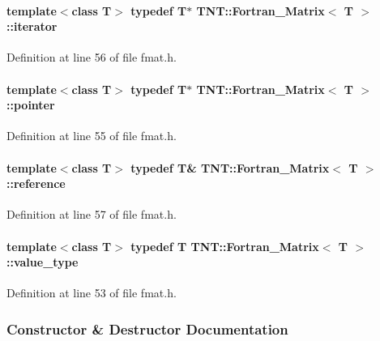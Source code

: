 \paragraph[{iterator}]{\setlength{\rightskip}{0pt plus 5cm}template$<$class T$>$ typedef T$\ast$ {\bf TNT::Fortran\_\-Matrix}$<$ T $>$::{\bf iterator}}\hfill\label{class_t_n_t_1_1_fortran___matrix_a43dc25f8986fe19bd84f04e53b4baba7}


Definition at line 56 of file fmat.h.

\paragraph[{pointer}]{\setlength{\rightskip}{0pt plus 5cm}template$<$class T$>$ typedef T$\ast$ {\bf TNT::Fortran\_\-Matrix}$<$ T $>$::{\bf pointer}}\hfill\label{class_t_n_t_1_1_fortran___matrix_a2e1ff91e3d9b097f41b3e773808b5079}


Definition at line 55 of file fmat.h.

\paragraph[{reference}]{\setlength{\rightskip}{0pt plus 5cm}template$<$class T$>$ typedef T\& {\bf TNT::Fortran\_\-Matrix}$<$ T $>$::{\bf reference}}\hfill\label{class_t_n_t_1_1_fortran___matrix_a708e0a8fa61611d331137048c3006d5c}


Definition at line 57 of file fmat.h.

\paragraph[{value\_\-type}]{\setlength{\rightskip}{0pt plus 5cm}template$<$class T$>$ typedef T {\bf TNT::Fortran\_\-Matrix}$<$ T $>$::{\bf value\_\-type}}\hfill\label{class_t_n_t_1_1_fortran___matrix_a62141b9cb8cc507fc9428eaf47ebe2a5}


Definition at line 53 of file fmat.h.



\subsubsection{Constructor \& Destructor Documentation}
